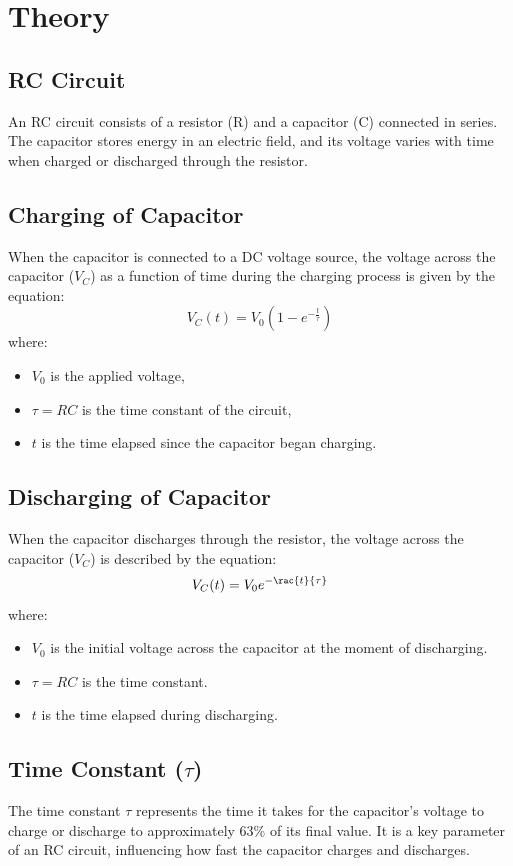 \documentclass[a4paper,12pt]{article}
\begin{document}
\section*{\color{myblue}Theory}

\subsection*{\color{mygreen}RC Circuit}
An RC circuit consists of a resistor (R) and a capacitor (C) connected in series. The capacitor stores energy in an electric field, and its voltage varies with time when charged or discharged through the resistor.

\subsection*{\color{mygreen}Charging of Capacitor}
When the capacitor is connected to a DC voltage source, the voltage across the capacitor ($V_C$) as a function of time during the charging process is given by the equation:
\[
V_C(t) = V_0 \left( 1 - e^{-\frac{t}{\tau}} \right)
\]
where:
\begin{itemize}
    \item $V_0$ is the applied voltage,
    \item $\tau = RC$ is the time constant of the circuit,
    \item $t$ is the time elapsed since the capacitor began charging.
\end{itemize}

\subsection*{\color{mygreen}Discharging of Capacitor}
When the capacitor discharges through the resistor, the voltage across the capacitor ($V_C$) is described by the equation:
\[
V_C(t) = V_0 e^{-\rac{t}{\tau}}
\]
where:
\begin{itemize}
    \item $V_0$ is the initial voltage across the capacitor at the moment of discharging.
    \item $\tau = RC$ is the time constant.
    \item $t$ is the time elapsed during discharging.
\end{itemize}

\subsection*{\color{mygreen}Time Constant ($\tau$)}
The time constant $\tau$ represents the time it takes for the capacitor's voltage to charge or discharge to approximately 63\% of its final value. It is a key parameter of an RC circuit, influencing how fast the capacitor charges and discharges.
\end{document}
